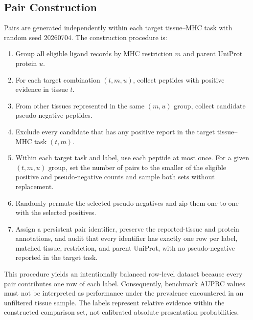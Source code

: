 \subsection{Pair Construction}

Pairs are generated independently within each target tissue--MHC task with random seed 20260704. The construction procedure is:

\begin{enumerate}
    \item Group all eligible ligand records by MHC restriction \(m\) and parent UniProt protein \(u\).
    \item For each target combination \((t,m,u)\), collect peptides with positive evidence in tissue \(t\).
    \item From other tissues represented in the same \((m,u)\) group, collect candidate pseudo-negative peptides.
    \item Exclude every candidate that has any positive report in the target tissue--MHC task \((t,m)\).
    \item Within each target task and label, use each peptide at most once. For a given \((t,m,u)\) group, set the number of pairs to the smaller of the eligible positive and pseudo-negative counts and sample both sets without replacement.
    \item Randomly permute the selected pseudo-negatives and zip them one-to-one with the selected positives.
    \item Assign a persistent pair identifier, preserve the reported-tissue and protein annotations, and audit that every identifier has exactly one row per label, matched tissue, restriction, and parent UniProt, with no pseudo-negative reported in the target task.
\end{enumerate}

This procedure yields an intentionally balanced row-level dataset because every pair contributes one row of each label. Consequently, benchmark AUPRC values must not be interpreted as performance under the prevalence encountered in an unfiltered tissue sample. The labels represent relative evidence within the constructed comparison set, not calibrated absolute presentation probabilities.

